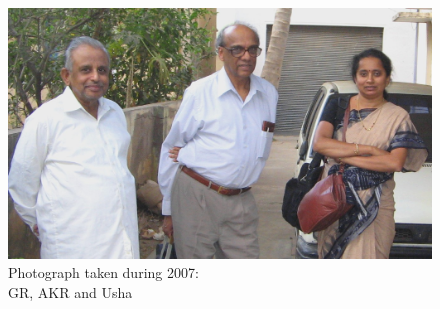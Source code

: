 \begin{figure}[h]
\centering
\includegraphics[scale=0.21]{src/images/chap18/001.eps}
\caption{Photograph taken during 2007:\\ GR, AKR and Usha}\label{chap18-fig001}
\end{figure}

